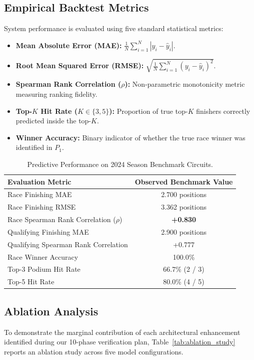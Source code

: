 \subsection{Empirical Backtest Metrics}
System performance is evaluated using five standard statistical metrics:
\begin{itemize}
    \item \textbf{Mean Absolute Error (MAE):} $\frac{1}{N} \sum_{i=1}^N |y_i - \hat{y}_i|$.
    \item \textbf{Root Mean Squared Error (RMSE):} $\sqrt{\frac{1}{N} \sum_{i=1}^N (y_i - \hat{y}_i)^2}$.
    \item \textbf{Spearman Rank Correlation ($\rho$):} Non-parametric monotonicity metric measuring ranking fidelity.
    \item \textbf{Top-$K$ Hit Rate ($K \in \{3, 5\}$):} Proportion of true top-$K$ finishers correctly predicted inside the top-$K$.
    \item \textbf{Winner Accuracy:} Binary indicator of whether the true race winner was identified in $P_1$.
\end{itemize}

\begin{table}[t]
\centering
\caption{Predictive Performance on 2024 Season Benchmark Circuits.}
\label{tab:backtest_benchmarks}
\begin{tabular}{lc}
\toprule
\textbf{Evaluation Metric} & \textbf{Observed Benchmark Value} \\
\midrule
Race Finishing MAE & 2.700 positions \\
Race Finishing RMSE & 3.362 positions \\
Race Spearman Rank Correlation ($\rho$) & \textbf{+0.830} \\
Qualifying Finishing MAE & 2.900 positions \\
Qualifying Spearman Rank Correlation & +0.777 \\
Race Winner Accuracy & 100.0\% \\
Top-3 Podium Hit Rate & 66.7\% (2 / 3) \\
Top-5 Hit Rate & 80.0\% (4 / 5) \\
\bottomrule
\end{tabular}
\end{table}

\subsection{Ablation Analysis}
To demonstrate the marginal contribution of each architectural enhancement identified during our 10-phase verification plan, Table~\ref{tab:ablation_study} reports an ablation study across five model configurations.

